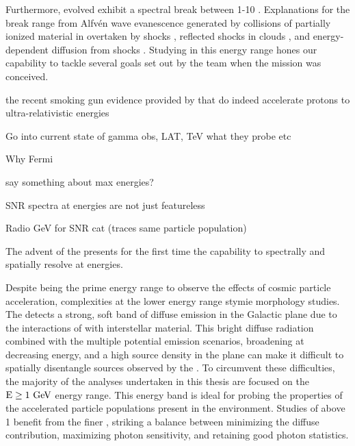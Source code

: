 {Furthermore, evolved \snrs{}  exhibit a spectral break between 1-10\gev{} \citep{Hewitt15}. Explanations for the break range from Alfv\' en wave evanescence generated by collisions of partially ionized material in \mcs{} overtaken by \snr{}  shocks \citep{Malkov11}, reflected shocks in clouds \cite{Inoue10c}, and energy-dependent diffusion from shocks \cite{Ohira11}. Studying \snrs{} in this energy range hones our capability to tackle several goals set out by the \Fermi{} team when the mission was conceived.

the recent smoking gun evidence provided by \FermiLat{} that \snrs{} do indeed accelerate protons to ultra-relativistic energies


Go into current state of gamma obs, LAT, TeV
what they probe etc



Why Fermi

say something about max energies?
	
SNR spectra at \gev{} energies are not just featureless \pl{}

Radio GeV for SNR cat (traces same particle population)

The advent of the \lat{} presents for the first time the capability to spectrally and spatially resolve \snrs{} at \gev{} energies.



Despite being the prime energy range to observe the effects of cosmic particle acceleration, complexities at the lower \lat{} energy range stymie \snr{} morphology studies. The \lat{} detects a strong, soft band of diffuse emission in the Galactic plane due to the interactions of  \crs{} with interstellar material. This bright diffuse radiation combined with the multiple potential emission scenarios, broadening \psf{} at decreasing energy, and a high source density in the plane can make it difficult to spatially disentangle sources observed by the \lat{}. To circumvent these 
difficulties, the majority of the analyses undertaken in this thesis are focused on the ${\rm E \geq 1~\mathrm{GeV}}$ energy range. This energy band is ideal for probing the properties of the accelerated particle populations present in the \snr{} environment. Studies of  \snrs{}  above 1\gev{} benefit from the finer \lat{} \psf{}, striking a balance between minimizing the diffuse contribution, maximizing photon sensitivity, and retaining good photon statistics.

}
